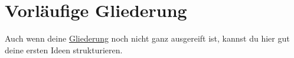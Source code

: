 
\section{Vorläufige Gliederung}
\label{sec:vorlaufige-gliederung}


Auch wenn deine \href{https://www.scribbr.de/category/aufbau-und-gliederung/}{Gliederung} noch nicht ganz ausgereift ist, kannst du hier gut deine ersten Ideen strukturieren.

